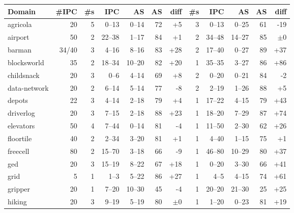 \documentclass{article}
\begin{document}
\begin{table}[h]
\begin{tabular}{@{}lr|rrrrr|rrrrr@{}}
       Domain & \#IPC & \#s &     IPC &     AS & AS &              diff & \#s &      IPC &     AS & AS &              diff \\
\midrule
     agricola &    20 &   5 &   0--13 &  0--14 & 72 &  {\color{blue}+5} &   3 &    0--13 &  0--25 & 61 &  {\color{red}-19} \\
      airport &    50 &   2 &  22--38 &  1--17 & 84 &  {\color{blue}+1} &   2 &   34--48 & 14--27 & 85 &           $\pm 0$ \\
       barman & 34/40 &   3 &   4--16 &  8--16 & 83 & {\color{blue}+28} &   2 &   17--40 &  0--27 & 89 & {\color{blue}+37} \\
  blocksworld &    35 &   2 &  18--34 & 10--20 & 82 & {\color{blue}+20} &   1 &   35--35 &  3--27 & 86 & {\color{blue}+86} \\
   childsnack &    20 &   3 &    0--6 &  4--14 & 69 &  {\color{blue}+8} &   2 &    0--20 &  0--21 & 84 &   {\color{red}-2} \\
 data-network &    20 &   2 &   6--14 &  5--14 & 77 &   {\color{red}-8} &   2 &    2--19 &  1--26 & 88 &  {\color{blue}+5} \\
       depots &    22 &   3 &   4--14 &  2--18 & 79 &  {\color{blue}+4} &   1 &   17--22 &  4--15 & 79 & {\color{blue}+43} \\
    driverlog &    20 &   3 &   7--15 &  2--18 & 88 & {\color{blue}+23} &   1 &   18--20 &  7--29 & 87 & {\color{blue}+74} \\
    elevators &    50 &   4 &   7--44 &  0--14 & 81 &   {\color{red}-4} &   1 &   11--50 &  2--30 & 62 & {\color{blue}+26} \\
    floortile &    40 &   2 &   2--34 &  3--20 & 81 &  {\color{blue}+1} &   1 &    4--40 &  1--15 & 75 &  {\color{blue}+1} \\
     freecell &    80 &   2 &  15--70 &  3--18 & 66 &   {\color{red}-9} &   1 &   46--80 & 10--29 & 80 & {\color{blue}+37} \\
          ged &    20 &   3 &  15--19 &  8--22 & 67 & {\color{blue}+18} &   1 &    0--20 &  3--30 & 66 & {\color{blue}+41} \\
         grid &     5 &   1 &    1--3 &  5--22 & 86 & {\color{blue}+27} &   1 &     4--5 &  4--15 & 74 & {\color{blue}+61} \\
      gripper &    20 &   1 &   7--20 & 10--30 & 45 &   {\color{red}-4} &   1 &   20--20 & 21--30 & 25 & {\color{blue}+25} \\
       hiking &    20 &   3 &   9--19 &  5--19 & 80 &           $\pm 0$ &   1 &    1--20 &  0--23 & 81 & {\color{blue}+19} \\

\end{tabular}
\end{table}
\end{document}

